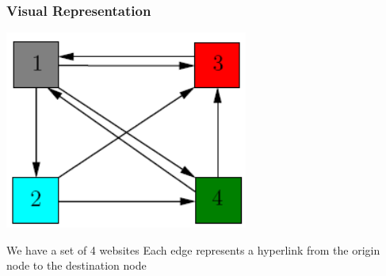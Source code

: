 \documentclass{beamer}
\begin{document}
\begin{frame}
\frametitle{Visual Representation}
\begin{center}
    \includegraphics[width=0.6\textwidth]{unweighted.png}
\end{center}
\begin{outline}
    \1 We have a set of 4 websites
    \1 Each edge represents a hyperlink from the origin node to the destination node 
\end{outline}
\end{frame}

\end{document}
